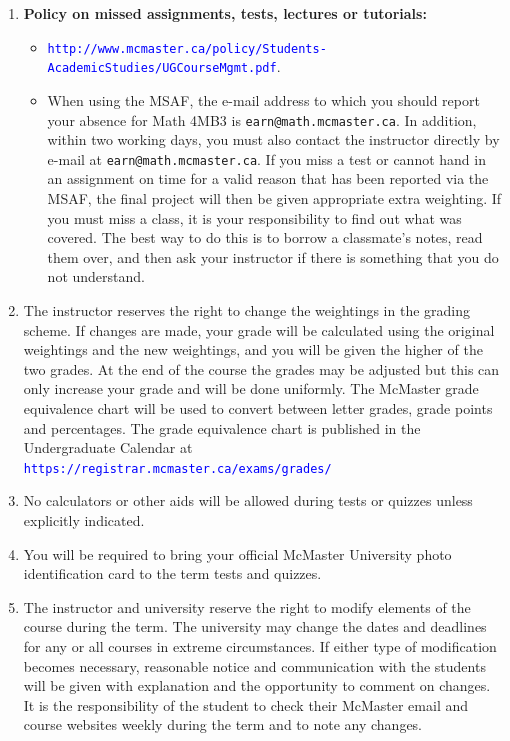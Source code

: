 \documentclass[12pt]{article}
\newcommand{\url}[1]{{\tt\textcolor{blue}{#1}}}
\begin{document}
\begin{enumerate}\addtolength{\itemsep}{-0.5\baselineskip}

\item {\bf Policy on missed assignments, tests, lectures or tutorials:} 
\begin{itemize}
\item \url{http://www.mcmaster.ca/policy/Students-AcademicStudies/UGCourseMgmt.pdf}.
\item When using the MSAF, the e-mail address to which you should report your absence for Math 4MB3 is {\tt earn@math.mcmaster.ca}.  In addition, within two working days, you must also contact the instructor directly by e-mail at {\tt earn@math.mcmaster.ca}.  If you miss a test or cannot hand in an assignment on time for a valid reason that has been reported via the MSAF, the final project will then be given appropriate extra weighting.  If you must miss a class, it is your responsibility to find out what was covered.  The best way to do this is to borrow a classmate's notes, read them over, and then ask your instructor if there is something that you do not understand.
\end{itemize}

\item The instructor reserves the right to change the weightings in the grading scheme. If changes are made, your grade will be calculated using the original weightings and the new weightings, and you will be given the higher of the two grades.  At the end of the course the grades may be adjusted but this can only increase your grade and will be done uniformly.  The McMaster grade equivalence chart will be used to convert between letter grades, grade points and percentages.  The grade equivalence chart is published in the Undergraduate Calendar at \url{https://registrar.mcmaster.ca/exams/grades/}

\item No calculators or other aids will be allowed during tests or quizzes unless explicitly indicated.

\item You will be required to bring your official McMaster University photo identification card to the term tests and quizzes.

\item The instructor and university reserve the right to modify elements of the course during the term.  The university may change the dates and deadlines for any or all courses in extreme circumstances.  If either type of modification becomes necessary, reasonable notice and communication with the students will be given with explanation and the opportunity to comment on changes.  It is the responsibility of the student to check their McMaster email and course websites weekly during the term and to note any changes.

\end{enumerate}
\end{document}
